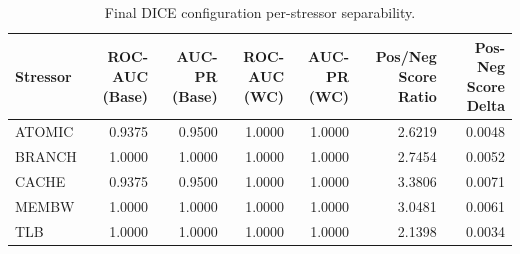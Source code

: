 \begin{table}[t]
\centering
\caption{Final DICE configuration per-stressor separability.}
\label{tab:dice_full_stressor}
\footnotesize
\begin{tabular}{lrrrrrr}
\toprule
Stressor & ROC-AUC (Base) & AUC-PR (Base) & ROC-AUC (WC) & AUC-PR (WC) & Pos/Neg Score Ratio & Pos-Neg Score Delta \\
\midrule
ATOMIC & 0.9375 & 0.9500 & 1.0000 & 1.0000 & 2.6219 & 0.0048 \\
BRANCH & 1.0000 & 1.0000 & 1.0000 & 1.0000 & 2.7454 & 0.0052 \\
CACHE & 0.9375 & 0.9500 & 1.0000 & 1.0000 & 3.3806 & 0.0071 \\
MEMBW & 1.0000 & 1.0000 & 1.0000 & 1.0000 & 3.0481 & 0.0061 \\
TLB & 1.0000 & 1.0000 & 1.0000 & 1.0000 & 2.1398 & 0.0034 \\
\bottomrule
\end{tabular}

\end{table}
